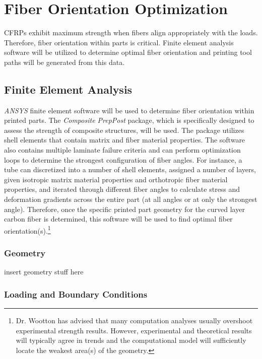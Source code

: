 \section{Fiber Orientation Optimization}

\indent

CFRPs exhibit maximum strength when fibers align appropriately with the loads. Therefore, fiber orientation within parts is critical. Finite element analysis software will be utilized to determine optimal fiber orientation and printing tool paths will be generated from this data.

\subsection{Finite Element Analysis}

\indent

\emph{ANSYS} finite element software will be used to determine fiber orientation within printed parts. The \emph{Composite PrepPost} package, which is specifically designed to assess the strength of composite structures, will be used. The package utilizes shell elements that contain matrix and fiber material properties. The software also contains multiple laminate failure criteria and can perform optimization loops to determine the strongest configuration of fiber angles. For instance, a tube can discretized into a number of shell elements, assigned a number of layers, given isotropic matrix material properties and orthotropic fiber material properties, and iterated through different fiber angles to calculate stress and deformation gradients across the entire part (at all angles or at only the strongest angle). Therefore, once the specific printed part geometry for the curved layer carbon fiber is determined, this software will be used to find optimal fiber orientation(s).\footnote{Dr. Wootton has advised that many computation analyses usually overshoot experimental strength results. However, experimental and theoretical results will typically agree in trends and the computational model will sufficiently locate the weakest area(s) of the geometry.}\\

\subsubsection{Geometry}

insert geometry stuff here

\subsubsection{Loading and Boundary Conditions}

